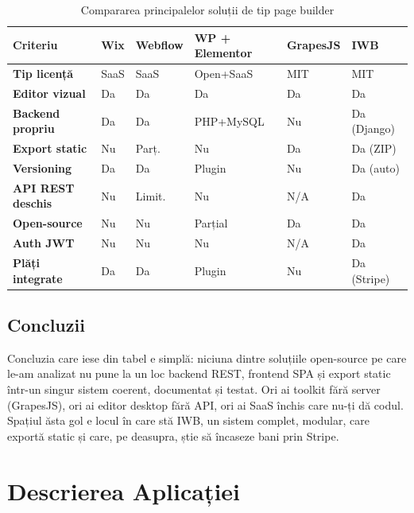 \documentclass[12pt,a4paper]{report}
\begin{document}
\begin{table}[htbp]
  \centering
  \caption{Compararea principalelor soluții de tip page builder}
  \label{tab:comparison}
  \renewcommand{\arraystretch}{1.3}
  \begin{tabularx}{\textwidth}{>{\bfseries}l *{5}{>{\centering\arraybackslash}X}}
    \toprule
    Criteriu & Wix & Webflow & WP + Elementor & GrapesJS & \textbf{IWB} \\
    \midrule
    Tip licență      & SaaS & SaaS  & Open+SaaS & MIT   & MIT \\
    Editor vizual    & Da   & Da    & Da        & Da    & Da \\
    Backend propriu  & Da   & Da    & PHP+MySQL & Nu    & Da (Django) \\
    Export static    & Nu   & Parț. & Nu        & Da    & Da (ZIP) \\
    Versioning       & Da   & Da    & Plugin    & Nu    & Da (auto) \\
    API REST deschis & Nu   & Limit.& Nu        & N/A   & Da \\
    Open-source      & Nu   & Nu    & Parțial   & Da    & Da \\
    Auth JWT         & Nu   & Nu    & Nu        & N/A   & Da \\
    Plăți integrate  & Da   & Da    & Plugin    & Nu    & Da (Stripe) \\
    \bottomrule
  \end{tabularx}
\end{table}

\section{Concluzii}

Concluzia care iese din tabel e simplă: niciuna dintre soluțiile open-source pe care
le-am analizat nu pune la un loc backend REST, frontend SPA și export static într-un
singur sistem coerent, documentat și testat. Ori ai toolkit fără server (GrapesJS),
ori ai editor desktop fără API, ori ai SaaS închis care nu-ți dă codul. Spațiul ăsta
gol e locul în care stă IWB, un sistem complet, modular, care exportă static și
care, pe deasupra, știe să încaseze bani prin Stripe.

\chapter{Descrierea Aplicației}
\end{document}
